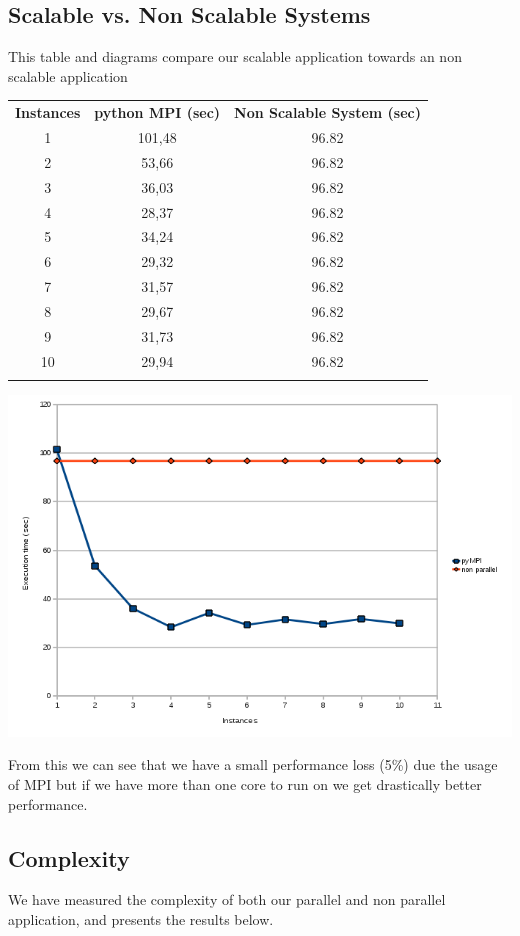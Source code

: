 \documentclass{article}
\begin{document}
\subsection{Scalable vs. Non Scalable Systems}
This table and diagrams compare our scalable application towards an non
scalable application

\begin{tabular}{c c c}
  \rowcolor[gray]{0.5}
  {\bf Instances} & {\bf python MPI (sec)} & {\bf Non Scalable System (sec)} \\
  1 & 101,48 & 96.82 \\
  2 & 53,66  & 96.82  \\
  3 & 36,03  & 96.82  \\
  4 & 28,37  & 96.82  \\
  5 & 34,24  & 96.82  \\
  6 & 29,32  & 96.82  \\
  7 & 31,57  & 96.82  \\
  8 & 29,67  & 96.82  \\
  9 & 31,73  & 96.82  \\
 10 & 29,94  & 96.82  \\
\rowcolor[gray]{0.5}
\end{tabular}
\newline
\includegraphics[width=\textwidth]{img/parallel-vs-non-parallel.png}

From this we can see that we have a small performance loss (5\%) due the usage
of MPI but if we have more than one core to run on we get drastically better
performance.


\subsection{Complexity}
We have measured the complexity of both our parallel and non parallel
application, and presents the results below.
\end{document}
